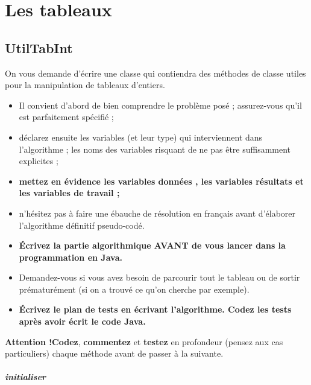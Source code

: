 \documentclass[11pt,a4paper]{article}
\begin{document}
            \section{Les tableaux}\subsection{UtilTabInt}
					On vous demande d'\'ecrire une classe
					\verb@UtilTabInt@
					qui contiendra des m\'ethodes de classe utiles 
					pour la manipulation de tableaux d'entiers.
				
            \par
        
					\begin{itemize}
				
			\item Il convient d'abord de bien comprendre le probl\`eme pos\'e ; assurez-vous qu'il est parfaitement sp\'ecifi\'e ;
			\item d\'eclarez ensuite les variables (et leur type) qui interviennent dans l'algorithme ; les noms des variables risquant de ne pas \^etre suffisamment explicites ;
			\item \textbf{mettez en \'evidence les variables \guillemotleft  donn\'ees \guillemotright , les variables \guillemotleft  r\'esultats \guillemotright  et les variables de travail ;}
			\item n'h\'esitez pas \`a faire une \'ebauche de r\'esolution en fran\c cais avant d'\'elaborer l'algorithme d\'efinitif pseudo-cod\'e.
			\item \textbf{\'Ecrivez la partie algorithmique AVANT de vous lancer dans la programmation en Java.}
			\item Demandez-vous si vous avez besoin de parcourir tout le tableau ou de sortir pr\'ematur\'ement (si on a trouv\'e ce qu'on cherche par exemple).
			\item \textbf{\'Ecrivez le plan de tests en \'ecrivant l'algorithme. Codez les tests apr\`es avoir \'ecrit le code Java.}
					\end{itemize}
				
            \par
        \textbf{Attention !}\textbf{Codez}, \textbf{commentez} 
					et \textbf{testez} en profondeur
					(pensez aux cas particuliers)
					chaque m\'ethode avant de passer \`a la suivante.
				
            \par
        
			
		\subparagraph{initialiser} 
		
\end{document}
